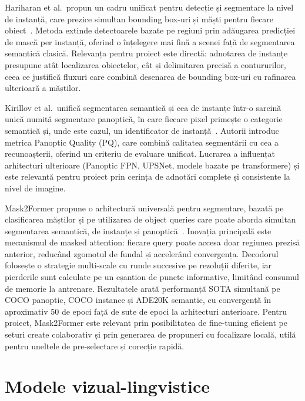 Hariharan et al.\ propun un cadru unificat pentru detecție și segmentare la nivel de instanță, care prezice simultan bounding box-uri și măști pentru fiecare obiect~\cite{hariharan2014simultaneousdetectionsegmentation}. Metoda extinde detectoarele bazate pe regiuni prin adăugarea predicției de mască per instanță, oferind o înțelegere mai fină a scenei față de segmentarea semantică clasică. Relevanța pentru proiect este directă: adnotarea de instanțe presupune atât localizarea obiectelor, cât și delimitarea precisă a contururilor, ceea ce justifică fluxuri care combină desenarea de bounding box-uri cu rafinarea ulterioară a măștilor.

Kirillov et al.\ unifică segmentarea semantică și cea de instanțe într-o sarcină unică numită segmentare panoptică, în care fiecare pixel primește o categorie semantică și, unde este cazul, un identificator de instanță~\cite{kirillov2019panopticsegmentation}. Autorii introduc metrica Panoptic Quality (PQ), care combină calitatea segmentării cu cea a recunoașterii, oferind un criteriu de evaluare unificat. Lucrarea a influențat arhitecturi ulterioare (Panoptic FPN, UPSNet, modele bazate pe transformere) și este relevantă pentru proiect prin cerința de adnotări complete și consistente la nivel de imagine.

Mask2Former propune o arhitectură universală pentru segmentare, bazată pe clasificarea măștilor și pe utilizarea de object queries care poate aborda simultan segmentarea semantică, de instanțe și panoptică~\cite{cheng2022maskedattentionmasktransformeruniversal}. Inovația principală este mecanismul de masked attention: fiecare query poate accesa doar regiunea prezisă anterior, reducând zgomotul de fundal și accelerând convergența. Decodorul folosește o strategie multi-scale cu runde succesive pe rezoluții diferite, iar pierderile sunt calculate pe un eșantion de puncte informative, limitând consumul de memorie la antrenare. Rezultatele arată performanță SOTA simultană pe COCO panoptic, COCO instance și ADE20K semantic, cu convergență în aproximativ 50 de epoci față de sute de epoci la arhitecturi anterioare. Pentru proiect, Mask2Former este relevant prin posibilitatea de fine-tuning eficient pe seturi create colaborativ și prin generarea de propuneri cu focalizare locală, utilă pentru uneltele de pre-selectare și corecție rapidă.

\section{Modele vizual-lingvistice}

